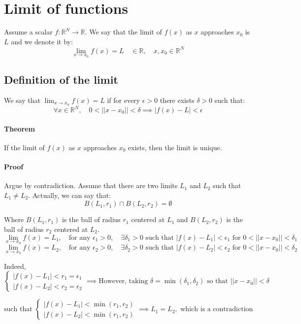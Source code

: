 \documentclass[11pt]{article}
\begin{document}
\section{Limit of functions}
Assume a scalar $f : \mathbb{R}^N \rightarrow \mathbb{R}$.
We say that the limit of $f(x)$ as $x$ approaches $x_0$ is $L$ and we denote it by:
\[
\lim_{x \to x_0} f(x) = L \quad \in \mathbb{R}, \quad x, x_0 \in \mathbb{R}^N
\]

\subsection{Definition of the limit}
We say that $\lim_{x \to x_0} f(x) = L$ if for every $\epsilon > 0$ there exists $\delta > 0$ such that:
\[
\forall x \in \mathbb{R}^N, \quad 0 < ||x - x_0|| < \delta \implies |f(x) - L| < \epsilon
\]

\paragraph{Theorem}
If the limit of $f(x)$ as $x$ approaches $x_0$ exists, then the limit is unique.

\paragraph{Proof}
Argue by contradiction. Assume that there are two limits $L_1$ and $L_2$ such that $L_1 \neq L_2$.
\vskip 0.5cm
Actually, we can say that:
\[
B(L_1, r_1) \cap B(L_2, r_2) = \emptyset
\]

Where $B(L_1, r_1)$ is the ball of radius $r_1$ centered at $L_1$ and $B(L_2, r_2)$ is the ball of radius $r_2$ centered at $L_2$.
\[
\lim_{x \to x_0} f(x) = L_1, \quad \text{for any } \epsilon_1 > 0, \quad \exists \delta_1 > 0 \text{ such that } |f(x) - L_1| < \epsilon_1 \text{ for } 0 < ||x - x_0|| < \delta_1
\]
\[
\lim_{x \to x_0} f(x) = L_2, \quad \text{for any } \epsilon_2 > 0, \quad \exists \delta_2 > 0 \text{ such that } |f(x) - L_2| < \epsilon_2 \text{ for } 0 < ||x - x_0|| < \delta_2
\]

Indeed, 
\[
\begin{cases}
    |f(x) - L_1| < r_1 = \epsilon_1 \\
    |f(x) - L_2| < r_2 = \epsilon_2
\end{cases}
\implies \text{However, taking } \delta = \min(\delta_1, \delta_2) \text{ so that } ||x - x_0|| < \delta
\]

\[
\text{such that } 
\begin{cases}
    |f(x) - L_1| < \min(r_1 , r_2) \\
    |f(x) - L_2| < \min(r_1 , r_2) 
\end{cases}    
\implies L_1 = L_2, \text{ which is a contradiction}
\]
\end{document}
